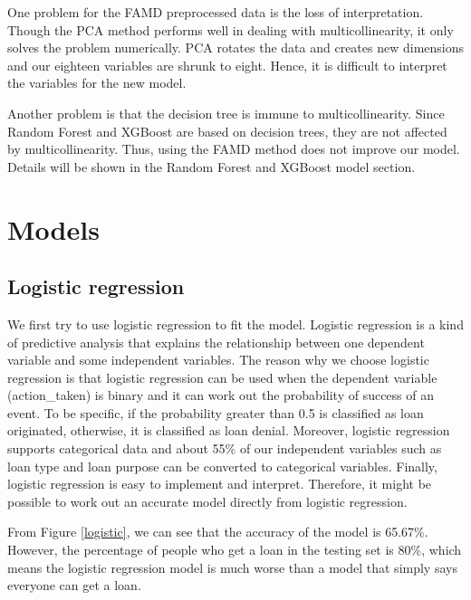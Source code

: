 \documentclass{jpp}
\begin{document}
One problem for the FAMD preprocessed data is the loss of interpretation. Though the PCA method performs well in dealing with multicollinearity, it only solves the problem numerically. PCA rotates the data and creates new dimensions and our eighteen variables are shrunk to eight. Hence, it is difficult to interpret the variables for the new model.

Another problem is that the decision tree is immune to multicollinearity. Since Random Forest and XGBoost are based on decision trees, they are not affected by multicollinearity. Thus, using the FAMD method does not improve our model. Details will be shown in the Random Forest and XGBoost model section.

\section{Models}
\subsection{Logistic regression}

We first try to use logistic regression to fit the model. Logistic regression is a kind of predictive analysis that explains the relationship between one dependent variable and some independent variables. The reason why we choose logistic regression is that logistic regression can be used when the dependent variable (action\_taken) is binary and it can work out the probability of success of an event. To be specific, if the probability greater than 0.5 is classified as loan originated, otherwise, it is classified as loan denial. Moreover, logistic regression supports categorical data and about 55\% of our independent variables such as loan type and loan purpose can be converted to categorical variables. Finally, logistic regression is easy to implement and interpret. Therefore, it might be possible to work out an accurate model directly from logistic regression.

From Figure \ref{logistic}, we can see that the accuracy of the model is 65.67\%. However, the percentage of people who get a loan in the testing set is 80\%, which means the logistic regression model is much worse than a model that simply says everyone can get a loan.
\end{document}
